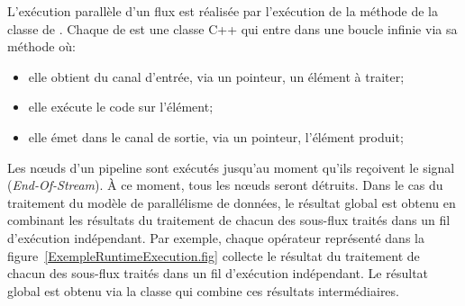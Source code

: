 
L'ex\'ecution parall\`ele d'un flux est r\'ealis\'ee par l'ex\'ecution de la m\'ethode  de la classe  de . Chaque  de  est une classe C++ qui entre dans une boucle infinie via sa m\'ethode  o\`u:
\begin{itemize}
	\item elle obtient du canal d'entr\'ee, via un pointeur, un \'el\'ement \`a traiter;
	\item elle ex\'ecute le code sur l'\'el\'ement;
	\item elle \'emet dans le canal de sortie,  via un pointeur,  l'\'el\'ement produit;
\end{itemize}

Les nœuds d'un pipeline sont ex\'ecut\'es jusqu'au moment qu'ils re\c coivent le signal  (\emph{End-Of-Stream}). \`A ce moment, tous les nœuds seront d\'etruits. Dans le cas du traitement du mod\`ele de parall\'elisme de donn\'ees, le r\'esultat global est obtenu en combinant les r\'esultats du traitement de chacun des sous-flux trait\'es dans un fil d'ex\'ecution ind\'ependant. Par exemple, chaque op\'erateur  repr\'esent\'e dans la figure~\ref{ExempleRuntimeExecution.fig} collecte le r\'esultat du traitement de chacun des sous-flux trait\'es dans un fil d'ex\'ecution ind\'ependant. Le r\'esultat global est obtenu via la classe  qui combine ces r\'esultats interm\'ediaires.
